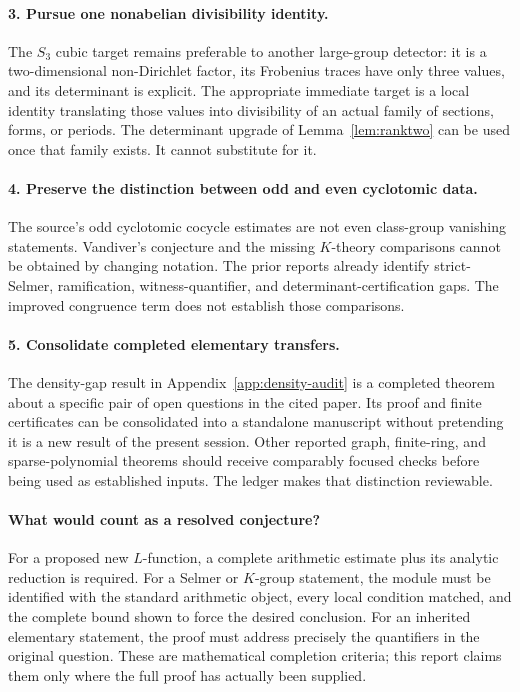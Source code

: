 \paragraph{3. Pursue one nonabelian divisibility identity.}
The \(S_3\) cubic target remains preferable to another large-group
detector: it is a two-dimensional non-Dirichlet factor, its Frobenius
traces have only three values, and its determinant is explicit.
The appropriate immediate target is a local identity translating
those values into divisibility of an actual family of sections,
forms, or periods. The determinant upgrade of
Lemma~\ref{lem:ranktwo} can be used once that family exists.
It cannot substitute for it.

\paragraph{4. Preserve the distinction between odd and even cyclotomic data.}
The source's odd cyclotomic cocycle estimates are not even class-group
vanishing statements. Vandiver's conjecture and the missing
\(K\)-theory comparisons cannot be obtained by changing notation.
The prior reports already identify strict-Selmer, ramification,
witness-quantifier, and determinant-certification gaps.
The improved congruence term does not establish those comparisons.

\paragraph{5. Consolidate completed elementary transfers.}
The density-gap result in Appendix~\ref{app:density-audit} is a completed
theorem about a specific pair of open questions in the cited paper.
Its proof and finite certificates can be consolidated into a standalone
manuscript without pretending it is a new result of the present session.
Other reported graph, finite-ring, and sparse-polynomial theorems should
receive comparably focused checks before being used as established
inputs. The ledger makes that distinction reviewable.

\paragraph{What would count as a resolved conjecture?}
For a proposed new \(L\)-function, a complete arithmetic estimate plus
its analytic reduction is required. For a Selmer or \(K\)-group
statement, the module must be identified with the standard arithmetic
object, every local condition matched, and the complete bound shown to
force the desired conclusion. For an inherited elementary statement,
the proof must address precisely the quantifiers in the original
question. These are mathematical completion criteria; this report
claims them only where the full proof has actually been supplied.

